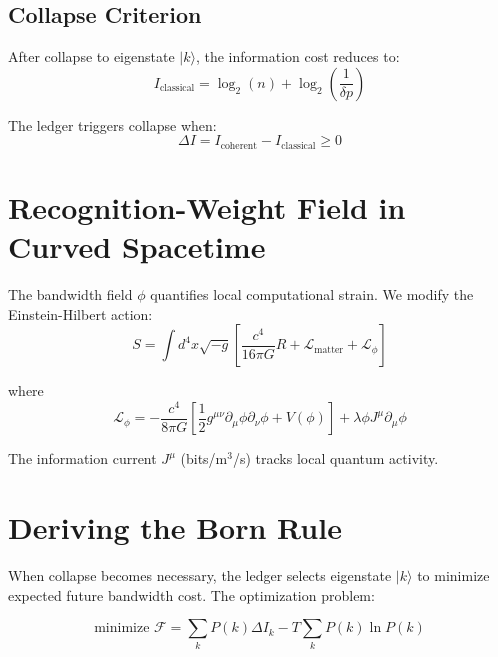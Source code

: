 \documentclass[twocolumn,prd,amsmath,amssymb,aps,superscriptaddress,nofootinbib]{revtex4-2}
\begin{document}
\subsection{Collapse Criterion}

After collapse to eigenstate $|k\rangle$, the information cost reduces to:
\begin{equation}
I_{\text{classical}} = \log_2(n) + \log_2\left(\frac{1}{\delta p}\right)
\label{eq:iclassical}
\end{equation}

The ledger triggers collapse when:
\begin{equation}
\Delta I = I_{\text{coherent}} - I_{\text{classical}} \geq 0
\label{eq:collapse_criterion}
\end{equation}

\section{Recognition-Weight Field in Curved Spacetime}
\label{sec:field}

The bandwidth field $\phi$ quantifies local computational strain. We modify the Einstein-Hilbert action:
\begin{equation}
S = \int d^4x \sqrt{-g} \left[\frac{c^4}{16\pi G}R + \mathcal{L}_{\text{matter}} + \mathcal{L}_{\phi}\right]
\label{eq:action}
\end{equation}

where
\begin{equation}
\mathcal{L}_{\phi} = -\frac{c^4}{8\pi G}\left[\frac{1}{2}g^{\mu\nu}\partial_\mu\phi\partial_\nu\phi + V(\phi)\right] + \lambda\phi J^\mu\partial_\mu\phi
\end{equation}

The information current $J^\mu$ (bits/m$^3$/s) tracks local quantum activity.

\section{Deriving the Born Rule}
\label{sec:born}

When collapse becomes necessary, the ledger selects eigenstate $|k\rangle$ to minimize expected future bandwidth cost. The optimization problem:

\begin{equation}
\text{minimize } \mathcal{F} = \sum_k P(k)\Delta I_k - T\sum_k P(k)\ln P(k)
\label{eq:born_opt}
\end{equation}
\end{document}
